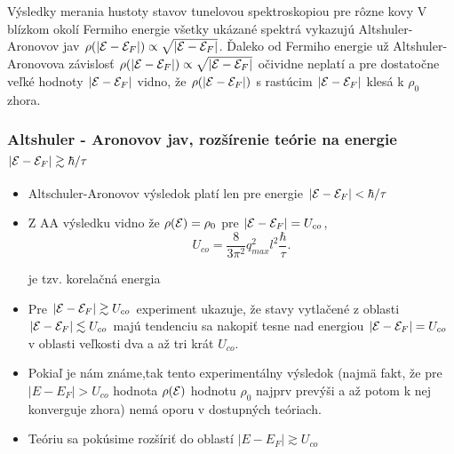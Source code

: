 \documentclass[
	11pt, %
]{beamer}
\begin{document}
\begin{frame}
\vspace{-10mm}
\begin{figure}%
    \centering
    \label{fig:example}%
\end{figure}
\small
Výsledky merania hustoty stavov tunelovou spektroskopiou pre rôzne kovy
V blízkom okolí Fermiho energie všetky ukázané spektrá vykazujú Altshuler-Aronovov jav $\rho(|\mathcal{E}- \mathcal{E}_F|) \propto \sqrt{|\mathcal{E}- \mathcal{E}_F|}$. Ďaleko od Fermiho energie už Altshuler-Aronovova závislosť
$\rho(|\mathcal{E}- \mathcal{E}_F|) \propto \sqrt{|\mathcal{E}- \mathcal{E}_F|}$ očividne neplatí a pre dostatočne veľké hodnoty $|\mathcal{E} - \mathcal{E}_F|$ vidno, že $\rho(|\mathcal{E}- \mathcal{E}_F|)$ s rastúcim $|\mathcal{E} - \mathcal{E}_F|$ klesá k $\rho_0$ zhora.
\normalsize
\end{frame}
\begin{frame}
\frametitle{Altshuler - Aronovov jav, rozšírenie teórie na energie $|\mathcal{E} - \mathcal{E}_F| \gtrsim \hbar/\tau$}
\begin{itemize}
\item Altschuler-Aronovov výsledok platí len pre energie $|\mathcal{E} - \mathcal{E}_F| < \hbar/\tau$
\item Z AA výsledku vidno že $\rho(\mathcal{E}) = \rho_0$ pre $|\mathcal{E}-\mathcal{E}_F| =  U_{co}$,
\begin{equation}
\label{eq:aa_U co korelenergia}
 U_{co} = \frac{8}{3\pi^{2}} q_{max}^2 l^2 \frac{\hbar}{\tau} \text{.}
\end{equation}

je tzv. korelačná energia
\item Pre $|\mathcal{E}-\mathcal{E}_F| \gtrsim  U_{co}$ experiment ukazuje, že stavy vytlačené z oblasti $|\mathcal{E}-\mathcal{E}_F| \lesssim  U_{co}$ majú tendenciu sa nakopiť tesne
nad energiou $|\mathcal{E}-\mathcal{E}_F| =  U_{co}$ v oblasti veľkosti dva a až tri krát $U_{co}$.
\item Pokiaľ je nám známe,tak tento experimentálny výsledok (najmä fakt, že  pre $|E-E_F| > U_{co}$ hodnota $\rho(\mathcal{E})$ hodnotu $\rho_0$
najprv prevýši a až potom k nej konverguje zhora) nemá oporu v dostupných teóriach.
\item Teóriu sa pokúsime rozšíriť do oblastí  $|E-E_F| \gtrsim U_{co}$
\end{itemize}
\end{frame}
\end{document}
